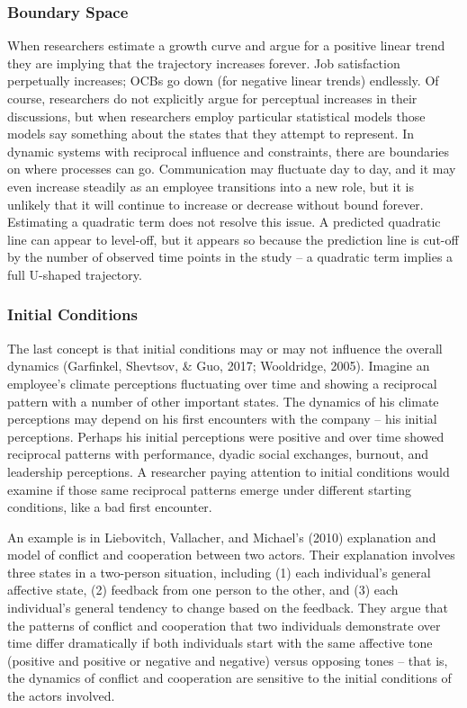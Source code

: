 \documentclass[english,,man]{apa6}
\begin{document}
\hypertarget{boundary-space}{%
\subsubsection{Boundary Space}\label{boundary-space}}

When researchers estimate a growth curve and argue for a positive linear trend they are implying that the trajectory increases forever. Job satisfaction perpetually increases; OCBs go down (for negative linear trends) endlessly. Of course, researchers do not explicitly argue for perceptual increases in their discussions, but when researchers employ particular statistical models those models say something about the states that they attempt to represent. In dynamic systems with reciprocal influence and constraints, there are boundaries on where processes can go. Communication may fluctuate day to day, and it may even increase steadily as an employee transitions into a new role, but it is unlikely that it will continue to increase or decrease without bound forever. Estimating a quadratic term does not resolve this issue. A predicted quadratic line can appear to level-off, but it appears so because the prediction line is cut-off by the number of observed time points in the study -- a quadratic term implies a full U-shaped trajectory.

\hypertarget{initial-conditions}{%
\subsubsection{Initial Conditions}\label{initial-conditions}}

The last concept is that initial conditions may or may not influence the overall dynamics (Garfinkel, Shevtsov, \& Guo, 2017; Wooldridge, 2005). Imagine an employee's climate perceptions fluctuating over time and showing a reciprocal pattern with a number of other important states. The dynamics of his climate perceptions may depend on his first encounters with the company -- his initial perceptions. Perhaps his initial perceptions were positive and over time showed reciprocal patterns with performance, dyadic social exchanges, burnout, and leadership perceptions. A researcher paying attention to initial conditions would examine if those same reciprocal patterns emerge under different starting conditions, like a bad first encounter.

An example is in Liebovitch, Vallacher, and Michael's (2010) explanation and model of conflict and cooperation between two actors. Their explanation involves three states in a two-person situation, including (1) each individual's general affective state, (2) feedback from one person to the other, and (3) each individual's general tendency to change based on the feedback. They argue that the patterns of conflict and cooperation that two individuals demonstrate over time differ dramatically if both individuals start with the same affective tone (positive and positive or negative and negative) versus opposing tones -- that is, the dynamics of conflict and cooperation are sensitive to the initial conditions of the actors involved.
\end{document}
